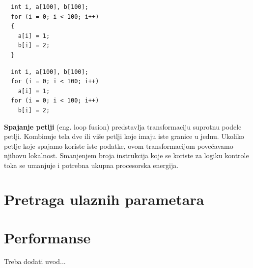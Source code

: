\documentclass[a4paper]{article}
\begin{document}
{\begin{lstlisting}
  int i, a[100], b[100];
  for (i = 0; i < 100; i++)
  {
    a[i] = 1; 
    b[i] = 2;
  }
\end{lstlisting}

\begin{lstlisting}
  int i, a[100], b[100];
  for (i = 0; i < 100; i++)
    a[i] = 1;                     
  for (i = 0; i < 100; i++)
    b[i] = 2;
\end{lstlisting}

\textbf{Spajanje petlji} (eng. loop fusion) predstavlja transformaciju suprotnu podele petlji. Kombinuje tela dve ili više petlji koje imaju iste
granice u jednu. Ukoliko petlje koje spajamo koriste iste podatke, ovom transformacijom povećavamo
njihovu lokalnost. Smanjenjem broja instrukcija koje se koriste za logiku kontrole toka se 
umanjuje i potrebna ukupna procesorska energija.

\section{Pretraga ulaznih parametara}
\label{sec:pretraga}

\section{Performanse}
\label{sec:performanse}
    Treba dodati uvod...

}
\end{document}
